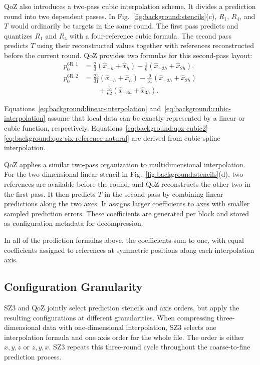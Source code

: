 QoZ also introduces a two-pass cubic interpolation scheme. It divides a prediction round into two dependent passes. In Fig.~\ref{fig:background:stencils}(c), $R_1$, $R_4$, and $T$ would ordinarily be targets in the same round. The first pass predicts and quantizes $R_1$ and $R_4$ with a four-reference cubic formula. The second pass predicts $T$ using their reconstructed values together with references reconstructed before the current round. QoZ provides two formulas for this second-pass layout:
\begin{align}
p_0^{\mathrm{6R},1}&=\frac{2}{3}(\hat x_{-h}+\hat x_h)-\frac{1}{6}(\hat x_{-2h}+\hat x_{2h}),\label{eq:background:qoz-six-reference-not-a-knot}\\
p_0^{\mathrm{6R},2}&=\frac{23}{31}(\hat x_{-h}+\hat x_h)-\frac{9}{31}(\hat x_{-2h}+\hat x_{2h})\nonumber\\
&\qquad+\frac{3}{62}(\hat x_{-3h}+\hat x_{3h}).\label{eq:background:qoz-six-reference-natural}
\end{align}

Equations~\eqref{eq:background:linear-interpolation} and~\eqref{eq:background:cubic-interpolation} assume that local data can be exactly represented by a linear or cubic function, respectively. Equations~\eqref{eq:background:qoz-cubic2}--\eqref{eq:background:qoz-six-reference-natural} are derived from cubic spline interpolation.

QoZ applies a similar two-pass organization to multidimensional interpolation. For the two-dimensional linear stencil in Fig.~\ref{fig:background:stencils}(d), two references are available before the round, and QoZ reconstructs the other two in the first pass. It then predicts $T$ in the second pass by combining linear predictions along the two axes. It assigns larger coefficients to axes with smaller sampled prediction errors. These coefficients are generated per block and stored as configuration metadata for decompression.

In all of the prediction formulas above, the coefficients sum to one, with equal coefficients assigned to references at symmetric positions along each interpolation axis.

\subsection{Configuration Granularity}
\label{sec:background:configuration-granularity}

SZ3 and QoZ jointly select prediction stencils and axis orders, but apply the resulting configurations at different granularities. When compressing three-dimensional data with one-dimensional interpolation, SZ3 selects one interpolation formula and one axis order for the whole file. The order is either $x,y,z$ or $z,y,x$. SZ3 repeats this three-round cycle throughout the coarse-to-fine prediction process.

